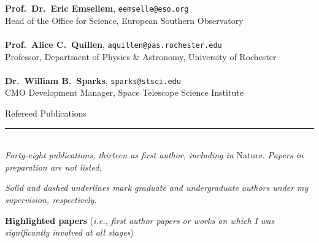 \documentclass[11pt]{article}
\makeatletter
\def\vhrulefill#1{\leavevmode\leaders\hrule\@height#1\hfill \kern\z@}
\makeatother
\begin{document}
{{\bf Prof.~Dr.~Eric Emsellem}, \texttt{eemselle@eso.org}\\
Head of the Office for Science, European Southern Observatory\\ \\
{\bf Prof.~Alice C.~Quillen}, \texttt{aquillen@pas.rochester.edu}\\
Professor, Department of Physics \& Astronomy, University of Rochester\\ \\
{\bf Dr.~William B.~Sparks}, \texttt{sparks@stsci.edu}\\
CMO Development Manager, Space Telescope Science Institute\\
}

\vspace{4mm}


\clearpage

{\sc Refereed Publications} \vhrulefill{0.4pt}\\


{\it Forty-eight publications, thirteen as first author, including in} Nature. {\it Papers in preparation are not listed.}

{\it Solid and dashed underlines mark graduate and undergraduate authors under my supervision, respectively.}\\

\vspace{-1mm}

{\bf Highlighted papers} ({\it i.e., first author papers or works on which I was significantly involved at all stages})\\

\vspace{-4mm}
\end{document}

